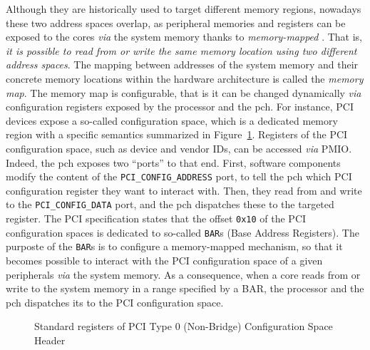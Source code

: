 Although they are historically used to target different memory regions, nowadays
these two address spaces overlap, as peripheral memories and registers can be
exposed to the cores \emph{via} the system memory thanks to \emph{memory-mapped}
\IOs.
%
That is, \emph{it is possible to read from or write the same memory location
  using two different address spaces}.
%
%
%
The mapping between addresses of the system memory and their concrete memory
locations within the hardware architecture is called the \emph{memory map}.
%
The memory map is configurable, that is it can be changed dynamically \emph{via}
configuration registers exposed by the processor and the \ac{pch}.
%
For instance, PCI
%
%
devices expose a so-called configuration space, which is a dedicated memory
region with a specific semantics summarized in
Figure~\ref{fig:usecase:pciconfig}.
%
Registers of the PCI configuration space, such as device and vendor IDs, can be
accessed \emph{via} PMIO.
%
Indeed, the \ac{pch} exposes two ``ports'' to that end.
%
First, software components modify the content of the
\texttt{PCI\_CONFIG\_ADDRESS} port, to tell the \ac{pch} which PCI configuration
register they want to interact with.
%
Then, they read from and write to the \texttt{PCI\_CONFIG\_DATA} port, and the
\ac{pch} dispatches these \IO to the targeted register.
%
The PCI specification states that the offset \texttt{0x10} of the PCI
configuration spaces is dedicated to so-called \texttt{BAR}s (Base Address
Registers).
%
The purposte of the \texttt{BAR}s is to configure a memory-mapped mechanism, so
that it becomes possible to interact with the PCI configuration space of a given
peripherals \emph{via} the system memory.
%
As a consequence, when a core reads from or write to the system memory in a
range specified by a BAR, the processor and the \ac{pch}
%
%
dispatches its \IOs to the PCI configuration space.

\begin{figure}
  \begin{center}
    \def\svgwidth{0.8\textwidth} \resizebox{0.6\textwidth}{!}{%
      }
  \end{center}
  \caption{Standard registers of PCI Type 0 (Non-Bridge) Configuration Space
    Header}
  \label{fig:usecase:pciconfig}
\end{figure}


